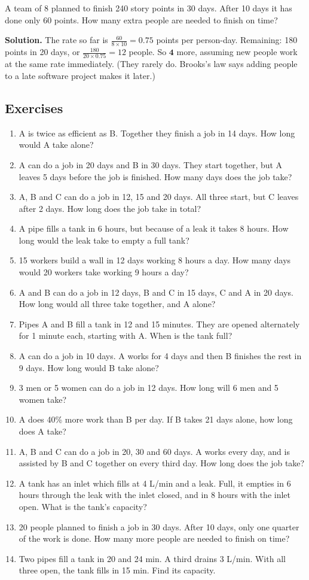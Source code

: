 \documentclass[11pt,a4paper,openany]{report}
\newenvironment{exercises}{\subsection*{Exercises \thechapter}\begin{enumerate}[label=\textbf{\thechapter.\arabic*},leftmargin=3.2em]}{\end{enumerate}}
\begin{document}
\begin{example}
A team of 8 planned to finish 240 story points in 30 days. After 10 days it has done only 60 points. How many extra people are needed to finish on time?

\textbf{Solution.} The rate so far is $\frac{60}{8\times10}=0.75$ points per person-day. Remaining: 180 points in 20 days, or $\frac{180}{20\times0.75}=12$ people. So $\mathbf{4}$ more, assuming new people work at the same rate immediately. (They rarely do. Brooks's law says adding people to a late software project makes it later.)
\end{example}

\begin{exercises}
\item A is twice as efficient as B. Together they finish a job in 14 days. How long would A take alone?
\item A can do a job in 20 days and B in 30 days. They start together, but A leaves 5 days before the job is finished. How many days does the job take?
\item A, B and C can do a job in 12, 15 and 20 days. All three start, but C leaves after 2 days. How long does the job take in total?
\item A pipe fills a tank in 6 hours, but because of a leak it takes 8 hours. How long would the leak take to empty a full tank?
\item 15 workers build a wall in 12 days working 8 hours a day. How many days would 20 workers take working 9 hours a day?
\item A and B can do a job in 12 days, B and C in 15 days, C and A in 20 days. How long would all three take together, and A alone?
\item Pipes A and B fill a tank in 12 and 15 minutes. They are opened alternately for 1 minute each, starting with A. When is the tank full?
\item A can do a job in 10 days. A works for 4 days and then B finishes the rest in 9 days. How long would B take alone?
\item 3 men or 5 women can do a job in 12 days. How long will 6 men and 5 women take?
\item A does 40\% more work than B per day. If B takes 21 days alone, how long does A take?
\item A, B and C can do a job in 20, 30 and 60 days. A works every day, and is assisted by B and C together on every third day. How long does the job take?
\item A tank has an inlet which fills at 4 L/min and a leak. Full, it empties in 6 hours through the leak with the inlet closed, and in 8 hours with the inlet open. What is the tank's capacity?
\item 20 people planned to finish a job in 30 days. After 10 days, only one quarter of the work is done. How many more people are needed to finish on time?
\item Two pipes fill a tank in 20 and 24 min. A third drains 3 L/min. With all three open, the tank fills in 15 min. Find its capacity.
\end{exercises}
\end{document}
